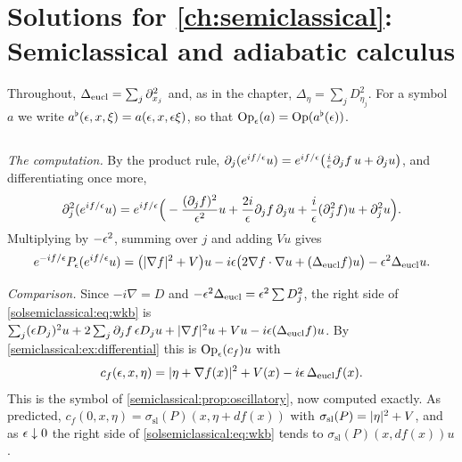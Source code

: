 \providecommand{\Psisl}[1]{\Psi^{#1}_{\mathrm{sl}}}
\providecommand{\Ssl}[1]{S^{#1}_{\mathrm{sl}}}
\providecommand{\Sslph}[1]{S^{#1}_{\mathrm{sl,ph}}}
\providecommand{\Psislph}[1]{\Psi^{#1}_{\mathrm{sl,ph}}}
\providecommand{\ssl}{\sigma_{\mathrm{sl}}}
\providecommand{\sad}{\sigma_{\mathrm{ad}}}
\providecommand{\Psiad}{\Psi^{-\infty}_{\mathrm{ad}}}
\providecommand{\Psisa}{\Psi^{-\infty}_{\mathrm{sl,ad}}}
\providecommand{\Amp}[2]{\mathcal{A}^{#1}_{#2}}

\section{Solutions for \cref{ch:semiclassical}: Semiclassical and adiabatic calculus}\label{solutions:semiclassical}

Throughout, $\Delta_{\mathrm{eucl}}=\sum_j\partial_{x_j}^2$ and, as in the chapter, $\Delta_\eta=\sum_jD_{\eta_j}^2$.
For a symbol $a$ we write $a^\flat(\epsilon,x,\xi)=a(\epsilon,x,\epsilon\xi)$, so that $\operatorname{Op}_\epsilon(a)=\operatorname{Op}(a^\flat(\epsilon))$.

\subsection*{}
\emph{The computation.} By the product rule,
$\partial_j(e^{if/\epsilon}u)=e^{if/\epsilon}\big(\tfrac i{\epsilon}\partial_jf\,u+\partial_ju\big)$, and differentiating once more,
\begin{equation*}
\partial_j^2(e^{if/\epsilon}u)=e^{if/\epsilon}\Big(-\frac{(\partial_jf)^2}{\epsilon^2}u+\frac{2i}{\epsilon}\partial_jf\,\partial_ju+\frac i{\epsilon}(\partial_j^2f)u+\partial_j^2u\Big).
\end{equation*}
Multiplying by $-\epsilon^2$, summing over $j$ and adding $Vu$ gives
\begin{equation}\label{solsemiclassical:eq:wkb}
e^{-if/\epsilon}P_\epsilon(e^{if/\epsilon}u)=\big(\lvert \nabla f\rvert^2+V\big)u-i\epsilon\big(2\nabla f\cdot\nabla u+(\Delta_{\mathrm{eucl}}f)u\big)-\epsilon^2\Delta_{\mathrm{eucl}}u .
\end{equation}

\emph{Comparison.} Since $-i\nabla=D$ and $-\epsilon^2\Delta_{\mathrm{eucl}}=\epsilon^2\sum D_j^2$, the right side of
\eqref{solsemiclassical:eq:wkb} is
$\sum_j(\epsilon D_j)^2u+2\sum_j\partial_jf\,\epsilon D_ju+\lvert \nabla f\rvert^2u+Vu-i\epsilon(\Delta_{\mathrm{eucl}}f)u$. By
\cref{semiclassical:ex:differential} this is $\operatorname{Op}_\epsilon(c_f)u$ with
\begin{equation*}
c_f(\epsilon,x,\eta)=\lvert \eta+\nabla f(x)\rvert^2+V(x)-i\epsilon\,\Delta_{\mathrm{eucl}}f(x).
\end{equation*}
This is the symbol of \cref{semiclassical:prop:oscillatory}, now computed exactly. As
predicted, $c_f(0,x,\eta)=\ssl(P)(x,\eta+df(x))$ with $\ssl(P)=\abs\eta^2+V$, and as
$\epsilon\downarrow0$ the right side of \eqref{solsemiclassical:eq:wkb} tends to $\ssl(P)(x,df(x))u$.

